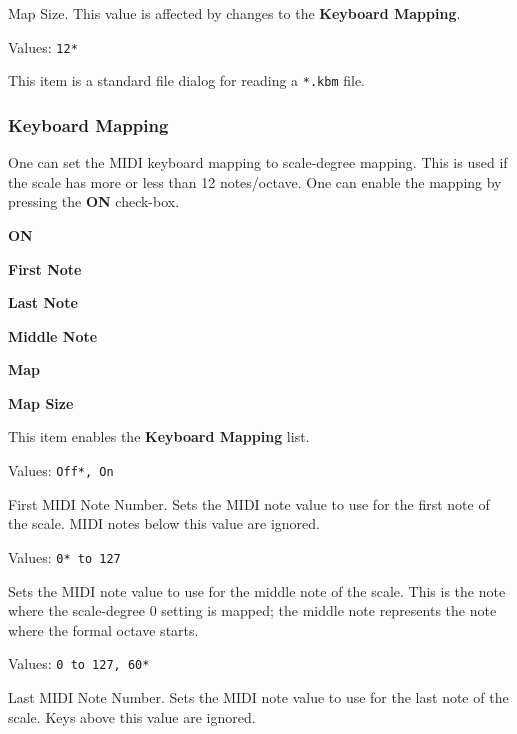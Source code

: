   Map Size.
   This value is affected by changes to the \textbf{Keyboard Mapping}.

   Values: \texttt{12*}

   This item is a standard file dialog for reading
   a \texttt{*.kbm} file.


\subsubsection{Keyboard Mapping}
\label{subsubsec:scales_keyboard_mapping}

   One can set the MIDI keyboard mapping to scale-degree mapping.
   This is used if the scale has more or less than 12 notes/octave.
   One can enable the mapping by pressing the \textbf{ON} check-box.

   \begin{enumber}
      \item \textbf{ON}
      \item \textbf{First Note}
      \item \textbf{Last Note}
      \item \textbf{Middle Note}
      \item \textbf{Map}
      \item \textbf{Map Size}
   \end{enumber}

   \setcounter{ItemCounter}{0}      %

   This item enables the \textbf{Keyboard Mapping} list.

   Values: \texttt{Off*, On}

   First MIDI Note Number.
   Sets the MIDI note value to use for the first note of the scale.
   MIDI notes below this value are ignored.

   Values: \texttt{0* to 127}

   Sets the MIDI note value to use for the middle note of the scale.
   This is the note where the scale-degree 0 setting is mapped;
   the middle note represents the note where the formal octave starts.

   Values: \texttt{0 to 127, 60*}

   Last MIDI Note Number.
   Sets the MIDI note value to use for the last note of the scale.
   Keys above this value are ignored.

